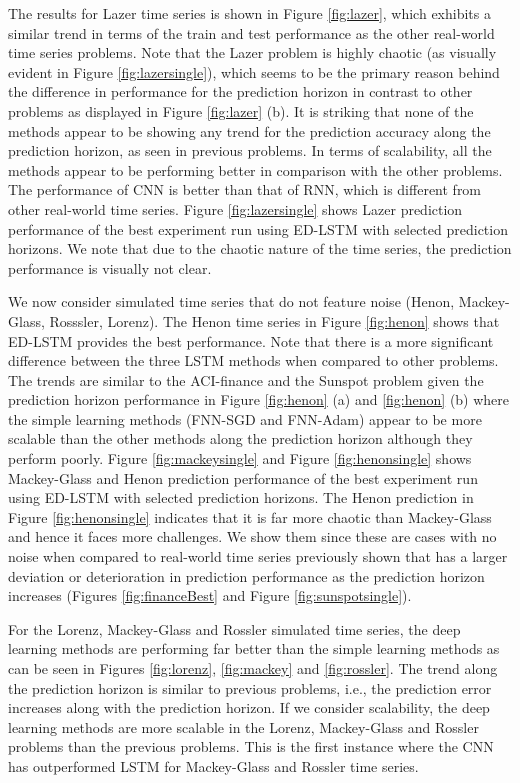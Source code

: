 \documentclass[final,5p,times,twocolumn]{elsarticle}
\begin{document}
The results for  Lazer time series  is shown in Figure \ref{fig:lazer}, which exhibits a similar trend in terms of the train and test performance as the other real-world time series problems. Note that the Lazer problem is highly chaotic (as visually evident in Figure \ref{fig:lazersingle}), which seems to be the primary reason behind the difference in performance for the prediction horizon in contrast to other problems as displayed in Figure \ref{fig:lazer} (b). It is striking that none of the methods appear to be showing any trend for the prediction accuracy along the prediction horizon, as seen in previous problems. In terms of scalability, all the methods appear to be performing better in comparison with the other problems. The performance of CNN is better than that of RNN, which is different from other real-world time series. Figure \ref{fig:lazersingle}  shows Lazer prediction performance of the best experiment run using ED-LSTM with selected prediction horizons. We note that due to the chaotic nature of the time series, the prediction performance is visually not clear. 
 

We now consider simulated time series that do not feature noise (Henon, Mackey-Glass, Rosssler, Lorenz). The Henon time series in  Figure \ref{fig:henon}  shows that ED-LSTM provides the best performance. Note that there is a more significant difference between the three LSTM methods   when compared to other problems. The trends are similar to the ACI-finance  and the Sunspot problem  given the prediction horizon performance in Figure \ref{fig:henon} (a) and \ref{fig:henon} (b) where the simple learning methods (FNN-SGD and FNN-Adam) appear to be more scalable than the other methods along the prediction horizon although they perform poorly.  Figure \ref{fig:mackeysingle}  and Figure \ref{fig:henonsingle} shows Mackey-Glass and Henon prediction  performance of the best experiment run using ED-LSTM with selected prediction horizons. The Henon prediction in Figure \ref{fig:henonsingle}  indicates that it is far more  chaotic than Mackey-Glass  and hence it  faces more challenges. We show them since these are cases with no noise when compared to real-world time series previously shown that has a larger  deviation or deterioration in prediction performance as the prediction horizon increases (Figures \ref{fig:financeBest} and Figure \ref{fig:sunspotsingle}). 

For the Lorenz, Mackey-Glass and Rossler simulated time series, the deep learning methods are performing far better than the simple learning methods as can be seen in Figures \ref{fig:lorenz}, \ref{fig:mackey} and \ref{fig:rossler}. The trend along the prediction horizon is similar to previous problems, i.e., the prediction error increases along with the prediction horizon. If we consider scalability, the deep learning  methods are more scalable in the Lorenz, Mackey-Glass and Rossler problems than the previous problems.   This is the first instance where the CNN has outperformed LSTM for Mackey-Glass and Rossler time series. 
  
\end{document}
